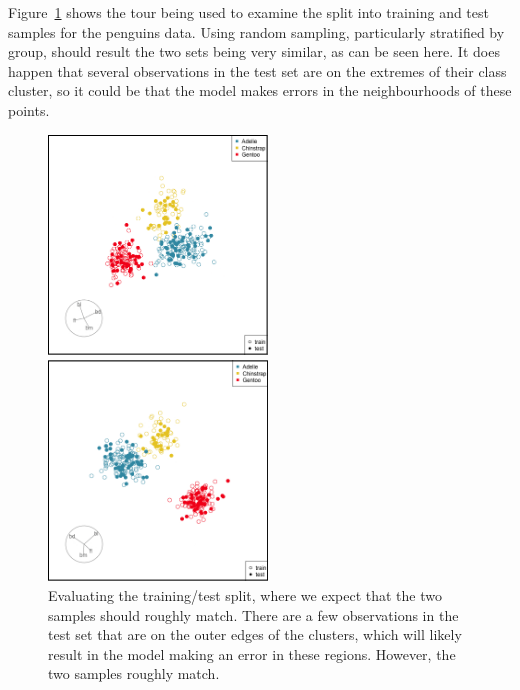 \documentclass[
  letterpaper,
]{krantz}
\begin{document}
Figure~\ref{fig-p-split-pdf} shows the tour being used to examine the
split into training and test samples for the penguins data. Using random
sampling, particularly stratified by group, should result the two sets
being very similar, as can be seen here. It does happen that several
observations in the test set are on the extremes of their class cluster,
so it could be that the model makes errors in the neighbourhoods of
these points.

\begin{figure}

\begin{minipage}{0.50\linewidth}

\includegraphics[width=2.29167in,height=\textheight,keepaspectratio]{images/p_split.png}

\end{minipage}%
%
\begin{minipage}{0.50\linewidth}

\includegraphics[width=2.29167in,height=\textheight,keepaspectratio]{images/p_split_guided.png}

\end{minipage}%

\caption{\label{fig-p-split-pdf}Evaluating the training/test split,
where we expect that the two samples should roughly match. There are a
few observations in the test set that are on the outer edges of the
clusters, which will likely result in the model making an error in these
regions. However, the two samples roughly match.}

\end{figure}%
\end{document}
